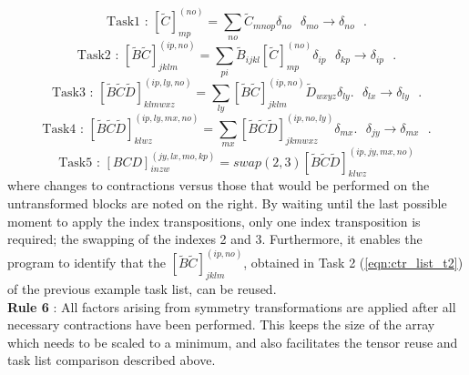\begin{equation*}
\text{Task1 \ : \ \ }
[\tilde{C}]^{(no)}_{mp} = \sum_{no} \tilde{C}_{mnop}\delta_{no}   \text{ \ \ \ $\delta_{mo} \rightarrow \delta_{no}$ }.
\end{equation*}
\begin{equation*}
\text{Task2 \ : \ \ }
[\tilde{B}\tilde{C}]^{(ip,no)}_{jklm} = \sum_{pi} \tilde{B}_{ijkl}[\tilde{C}]_{mp}^{(no)}\delta_{ip} 
\text{ \ \ \ $\delta_{kp} \rightarrow \delta_{ip}$ }.
\end{equation*}
\begin{equation*}
\text{Task3 \ : \ \ }
[\tilde{B}\tilde{C}\tilde{D}]^{(ip,ly,no)}_{klmwxz} =
\sum_{ly} [\tilde{B}\tilde{C}]^{(ip,no)}_{jklm} \tilde{D}_{wxyz}\delta_{ly}. 
\text{ \ \ \ $\delta_{lx} \rightarrow \delta_{ly}$ }.
\end{equation*}
\begin{equation*}
\text{Task4 \ : \ \ }
[\tilde{B}\tilde{C}\tilde{D}]^{(ip,ly,mx,no)}_{klwz} =
\sum_{mx} [\tilde{B}\tilde{C}\tilde{D}]^{(ip,no,ly)}_{jkmwxz}\delta_{mx}.
\text{ \ \ \ $\delta_{jy} \rightarrow \delta_{mx}$ }.
\end{equation*}
\begin{equation*}
\text{Task5 \ : \ \ }
[BCD]^{(jy,lx,mo,kp)}_{inzw} = swap(2,3) [\tilde{B}\tilde{C}\tilde{D}]^{(ip,jy,mx,no)}_{klwz}
\end{equation*}
where changes to contractions versus those that would be performed on the
untransformed blocks are noted on the right. By waiting until the last
possible moment to apply the index transpositions,
only one index transposition is required; the swapping of the indexes 2 and 3.
Furthermore, it enables the program to identify that the $[\tilde{B}\tilde{C}]^{(ip,no)}_{jklm}$,
obtained in Task 2 (\ref{eqn:ctr_list_t2}) of the previous example task list, can be reused.\\ 
 
\noindent \textbf{Rule 6} : All factors
arising from symmetry transformations are applied after all necessary
contractions have been performed. This keeps the size of the array which needs
to be scaled to a minimum, and also facilitates the tensor reuse and task list comparison described above.
